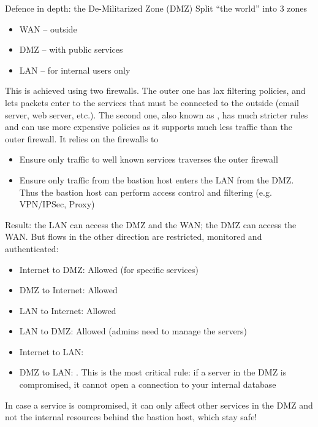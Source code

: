 \begin{parag}{Defence in depth: the De-Militarized Zone (DMZ)}
    Split ``the world'' into 3 zones
	\begin{itemize}
	    \item WAN -- outside
	    \item DMZ -- with public services
	    \item LAN -- for internal users only
	\end{itemize}
	This is achieved using two firewalls. The outer one has lax filtering policies, and lets packets enter to the services that must be connected to the outside (email server, web server, etc.). The second one, also known as , has much stricter rules and can use more expensive policies as it supports much less traffic than the outer firewall. It relies on the firewalls to
	\begin{itemize}
	    \item Ensure only traffic to well known services traverses the outer firewall
	    \item Ensure only traffic from the bastion host enters the LAN from the DMZ. Thus the bastion host can perform access control and filtering (e.g. VPN/IPSec, Proxy)
	\end{itemize}
	Result: the LAN can access the DMZ and the WAN; the DMZ can access the WAN. But flows in the other direction are restricted, monitored and authenticated:
	\begin{itemize}
	    \item Internet to DMZ: Allowed (for specific services)
	    \item DMZ to Internet: Allowed
	    \item LAN to Internet: Allowed
	    \item LAN to DMZ: Allowed (admins need to manage the servers)
	    \item Internet to LAN: 
	    \item DMZ to LAN: . This is the most critical rule: if a server in the DMZ is compromised, it cannot open a connection to your internal database
	\end{itemize}
	In case a service is compromised, it can only affect other services in the DMZ and not the internal resources behind the bastion host, which stay safe!
\end{parag}

